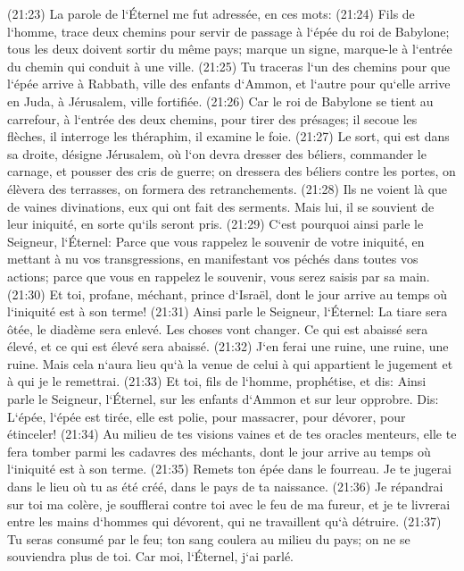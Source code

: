 \verse (21:23) La parole de l`Éternel me fut adressée, en ces mots: 
\verse (21:24) Fils de l`homme, trace deux chemins pour servir de passage à l`épée du roi de Babylone; tous les deux doivent sortir du même pays; marque un signe, marque-le à l`entrée du chemin qui conduit à une ville. 
\verse (21:25) Tu traceras l`un des chemins pour que l`épée arrive à Rabbath, ville des enfants d`Ammon, et l`autre pour qu`elle arrive en Juda, à Jérusalem, ville fortifiée. 
\verse (21:26) Car le roi de Babylone se tient au carrefour, à l`entrée des deux chemins, pour tirer des présages; il secoue les flèches, il interroge les théraphim, il examine le foie. 
\verse (21:27) Le sort, qui est dans sa droite, désigne Jérusalem, où l`on devra dresser des béliers, commander le carnage, et pousser des cris de guerre; on dressera des béliers contre les portes, on élèvera des terrasses, on formera des retranchements. 
\verse (21:28) Ils ne voient là que de vaines divinations, eux qui ont fait des serments. Mais lui, il se souvient de leur iniquité, en sorte qu`ils seront pris. 
\verse (21:29) C`est pourquoi ainsi parle le Seigneur, l`Éternel: Parce que vous rappelez le souvenir de votre iniquité, en mettant à nu vos transgressions, en manifestant vos péchés dans toutes vos actions; parce que vous en rappelez le souvenir, vous serez saisis par sa main. 
\verse (21:30) Et toi, profane, méchant, prince d`Israël, dont le jour arrive au temps où l`iniquité est à son terme! 
\verse (21:31) Ainsi parle le Seigneur, l`Éternel: La tiare sera ôtée, le diadème sera enlevé. Les choses vont changer. Ce qui est abaissé sera élevé, et ce qui est élevé sera abaissé. 
\verse (21:32) J`en ferai une ruine, une ruine, une ruine. Mais cela n`aura lieu qu`à la venue de celui à qui appartient le jugement et à qui je le remettrai. 
\verse (21:33) Et toi, fils de l`homme, prophétise, et dis: Ainsi parle le Seigneur, l`Éternel, sur les enfants d`Ammon et sur leur opprobre. Dis: L`épée, l`épée est tirée, elle est polie, pour massacrer, pour dévorer, pour étinceler! 
\verse (21:34) Au milieu de tes visions vaines et de tes oracles menteurs, elle te fera tomber parmi les cadavres des méchants, dont le jour arrive au temps où l`iniquité est à son terme. 
\verse (21:35) Remets ton épée dans le fourreau. Je te jugerai dans le lieu où tu as été créé, dans le pays de ta naissance. 
\verse (21:36) Je répandrai sur toi ma colère, je soufflerai contre toi avec le feu de ma fureur, et je te livrerai entre les mains d`hommes qui dévorent, qui ne travaillent qu`à détruire. 
\verse (21:37) Tu seras consumé par le feu; ton sang coulera au milieu du pays; on ne se souviendra plus de toi. Car moi, l`Éternel, j`ai parlé. 

